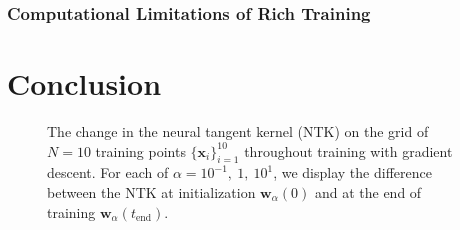 \documentclass{article}
\begin{document}
\subsubsection{Computational Limitations of Rich Training}


\section{Conclusion}

\begin{figure}[H]
\centering
{}\hfill
{}\par 
{}
\caption{The change in the neural tangent kernel (NTK) on the grid of $N= 10$ training points $\{ \boldsymbol{x}_i \}_{i=1}^{10}$ throughout training with gradient descent. For each of $\alpha = 10^{-1}, \ 1, \ 10^{1}$, we display the difference between the NTK at initialization $\boldsymbol{w}_{\alpha}(0)$ and at the end of training $\boldsymbol{w}_{\alpha}(t_{\text{end}})$.}\label{img:ntkchange}
\end{figure}

\pagebreak



\end{document}
